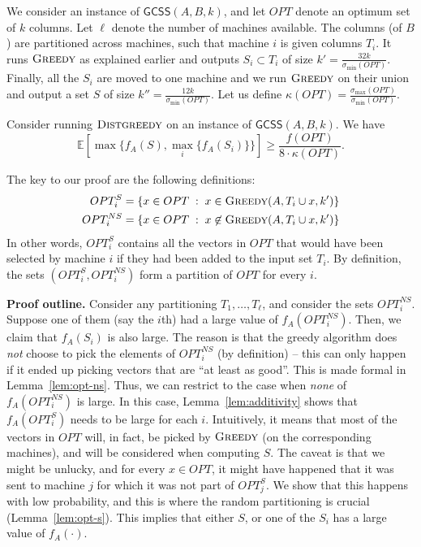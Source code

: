 \documentclass{article}
\newcommand{\E}{\mathbb{E}}
\newcommand{\greedy}{\textsc{Greedy}}
\newcommand{\distgreedy}{\textsc{Distgreedy}}
\newcommand{\opt}{OPT}
\newcommand{\gcss}{\textsf{GCSS}}
\begin{document}
We consider an instance of $\gcss(A, B, k)$, and let $\opt$ denote an optimum set of $k$ columns.
 Let $\ell$ denote the number of machines available.
 The columns (of $B$) are partitioned across machines, such that machine $i$ is given columns $T_i$. It runs $\greedy$ as explained earlier and outputs $S_i \subset T_i$ of size $k' = \frac{32k}{\sigma_{\min}(OPT)}$. Finally, all the $S_i$ are moved to one machine and we run $\greedy$ on their union and output a set $S$ of size $k'' = \frac{12k}{\sigma_{\min}(OPT)}$. Let us define $\kappa(\opt) = \frac{\sigma_{\max}(\opt)}{\sigma_{\min}(\opt)}$.

\begin{thm}\label{thm:distributed-main}
Consider running $\distgreedy$ on an instance of $\gcss(A, B, k)$. We have
\[ \E[ \max\{ f_A(S), \max_i \{f_A(S_i)\}\}] \ge \frac{f(\opt)}{8\cdot \kappa(\opt)}.\] 
\end{thm}
The key to our proof are the following definitions:
\begin{align*}
\opt_i^S &= \{x \in \opt \; : \; x \in \greedy(A, T_i \cup x, k') \}\\ 
\opt_i^{NS} &= \{x \in \opt \; : \; x \not \in \greedy(A, T_i \cup x, k') \}
\end{align*}
In other words, $OPT_i^S$ contains all the vectors in $OPT$ that would have been selected by machine $i$ if they had been added to the input set $T_i$. By definition, the sets $(OPT_i^S, OPT_i^{NS})$ form a partition of $OPT$ for every $i$.

\iffalse
\begin{remark} \label{rem-opt-partition}
By definition, $OPT = OPT_i^S \cup OPT_i^{NS}$ is a union of disjoint sets for all $i \in [m]$. That is, $OPT_i^S$ and $OPT_i^{NS}$ partition $OPT$.
\end{remark}
\fi

{\bf Proof outline.} Consider any partitioning $T_1, \dots, T_\ell$, and consider the sets $\opt_i^{NS}$. Suppose one of them (say the $i$th) had a large value of $f_A(\opt_i^{NS})$. Then, we claim that $f_A(S_i)$ is also large. The reason is that the greedy algorithm does {\em not} choose to pick the elements of $\opt_i^{NS}$ (by definition) -- this can only happen if it ended up picking vectors that are ``at least as good''. This is made formal in Lemma~\ref{lem:opt-ns}.  Thus, we can restrict to the case when {\em none} of $f_A(\opt_i^{NS})$ is large. In this case, Lemma~\ref{lem:additivity} shows that $f_A(\opt_i^{S})$ needs to be large for each $i$. Intuitively, it means that most of the vectors in $\opt$ will, in fact, be picked by $\greedy$ (on the corresponding machines), and will be considered when computing $S$. The caveat is that we might be unlucky, and for every $x \in \opt$, it might have happened that it was sent to machine $j$ for which it was not part of $\opt_j^{S}$. We show that this happens with low probability, and this is where the random partitioning is crucial (Lemma~\ref{lem:opt-s}).  This implies that either $S$, or one of the $S_i$ has a large value of $f_A(\cdot)$.
\end{document}
